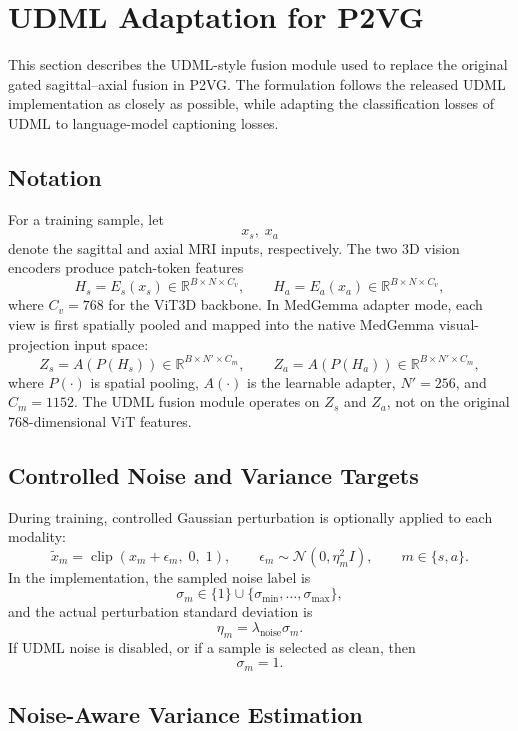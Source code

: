 \section{UDML Adaptation for P2VG}
\label{sec:udml_p2vg}

This section describes the UDML-style fusion module used to replace the original gated sagittal--axial fusion in P2VG.  The formulation follows the released UDML implementation as closely as possible, while adapting the classification losses of UDML to language-model captioning losses.

\subsection{Notation}

For a training sample, let
\[
    x_s,\; x_a
\]
denote the sagittal and axial MRI inputs, respectively. The two 3D vision encoders produce patch-token features
\[
    H_s = E_s(x_s) \in \mathbb{R}^{B \times N \times C_v},
    \qquad
    H_a = E_a(x_a) \in \mathbb{R}^{B \times N \times C_v},
\]
where \(C_v=768\) for the ViT3D backbone. In MedGemma adapter mode, each view is first spatially pooled and mapped into the native MedGemma visual-projection input space:
\[
    Z_s = A(P(H_s)) \in \mathbb{R}^{B \times N' \times C_m},
    \qquad
    Z_a = A(P(H_a)) \in \mathbb{R}^{B \times N' \times C_m},
\]
where \(P(\cdot)\) is spatial pooling, \(A(\cdot)\) is the learnable adapter, \(N'=256\), and \(C_m=1152\). The UDML fusion module operates on \(Z_s\) and \(Z_a\), not on the original \(768\)-dimensional ViT features.

\subsection{Controlled Noise and Variance Targets}

During training, controlled Gaussian perturbation is optionally applied to each modality:
\[
    \tilde{x}_m
    =
    \operatorname{clip}\left(x_m + \epsilon_m,\;0,\;1\right),
    \qquad
    \epsilon_m \sim \mathcal{N}(0, \eta_m^2 I),
    \qquad
    m \in \{s,a\}.
\]
In the implementation, the sampled noise label is
\[
    \sigma_m \in \{1\} \cup \{\sigma_{\min}, \ldots, \sigma_{\max}\},
\]
and the actual perturbation standard deviation is
\[
    \eta_m = \lambda_{\text{noise}} \sigma_m.
\]
If UDML noise is disabled, or if a sample is selected as clean, then
\[
    \sigma_m = 1.
\]

\subsection{Noise-Aware Variance Estimation}

